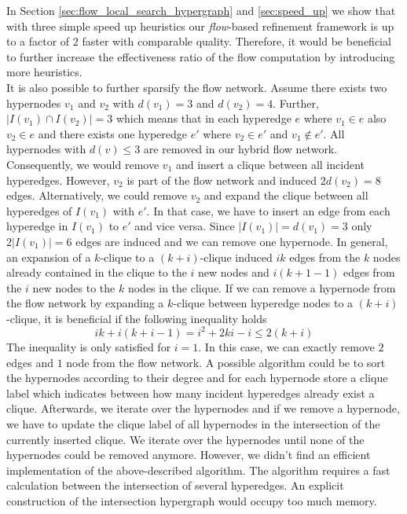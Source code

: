 In Section \ref{sec:flow_local_search_hypergraph} and \ref{sec:speed_up} we show that with
three simple speed up heuristics our \emph{flow}-based refinement framework is up to a factor
of $2$ faster with comparable quality. Therefore, it would be beneficial to further increase
the effectiveness ratio of the flow computation by introducing more heuristics. \\
It is also possible to further sparsify the flow network. Assume there exists two hypernodes
$v_1$ and $v_2$ with $d(v_1) = 3$ and $d(v_2) = 4$. Further, $|I(v_1) \cap I(v_2)| = 3$ which means
that in each hyperedge $e$ where $v_1 \in e$ also $v_2 \in e$ and there exists one hyperedge $e'$
where $v_2 \in e'$ and $v_1 \notin e'$. All hypernodes with $d(v) \le 3$ are removed in our
hybrid flow network. Consequently, we would remove $v_1$ and insert a clique between all incident
hyperedges. However, $v_2$ is part of the flow network and induced $2d(v_2) = 8$ edges.
Alternatively, we could remove $v_2$ and expand the clique between all hyperedges of $I(v_1)$
with $e'$. In that case, we have to insert an edge from each hyperedge in $I(v_1)$ to $e'$ and vice
versa. Since $|I(v_1)| = d(v_1) = 3$ only $2|I(v_1)| = 6$ edges are induced and we can remove
one hypernode. In general, an expansion of a $k$-clique to a $(k+i)$-clique induced 
$ik$ edges from the $k$ nodes already contained in the clique to the $i$ new nodes and
$i(k+1-1)$ edges from the $i$ new nodes to the $k$ nodes in the clique. If we can remove a 
hypernode from the flow network by expanding a $k$-clique between hyperedge nodes to a $(k+i)$-clique,
it is beneficial if the following inequality holds 
\[ik + i(k+i-1) = i^2 + 2ki - i \le 2(k+i)\]
The inequality is only satisfied for $i = 1$. In this case, we can exactly remove $2$ edges and
$1$ node from the flow network. A possible algorithm could be to sort the hypernodes according
to their degree and for each hypernode store a clique label which indicates between how many
incident hyperedges already exist a clique. Afterwards, we iterate over the hypernodes and if we remove
a hypernode, we have to update the clique label of all hypernodes in the intersection of the
currently inserted clique. We iterate over the hypernodes until none of the hypernodes could
be removed anymore. However, we didn't find an efficient implementation of the above-described
algorithm. The algorithm requires a fast calculation between the intersection of several
hyperedges. An explicit construction of the intersection hypergraph would occupy too much
memory. 
